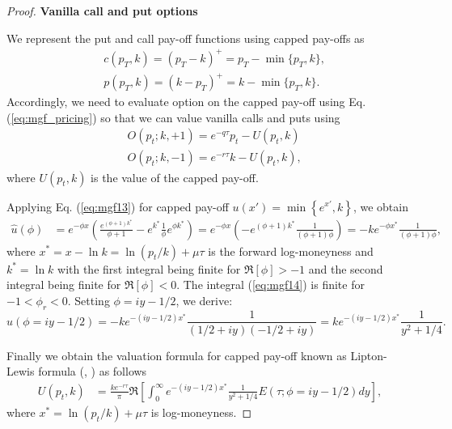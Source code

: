 \documentclass[pdftex,11pt,a4paper] {article}
\begin{document}
\begin{proof}


\textbf{Vanilla call and put options}

We represent the put and call pay-off functions using capped pay-offs as
\begin{equation} \label {eq:v11}
\begin{split}
  & c(p_T,k) = (p_T-k)^+=p_T-\min\{p_T,k\},\\
  & p(p_T,k) = (k-p_T)^+=k-\min\{p_T,k\}.
\end{split}
\end{equation}
Accordingly, we need to evaluate option on the capped pay-off using Eq. (\ref{eq:mgf_pricing}) so that we can value vanilla calls and puts using
\begin{equation} \label{eq:v9}
\begin{split}
  & O(p_{t}; k, +1)  = e^{-q\tau}p_{t}- U(p_{t}, k)\\
  & O(p_{t}; k, -1)  = e^{-r\tau} k - U(p_{t}, k),
\end{split}
\end{equation}
where $U(p_t,k)$ is the value of the capped pay-off.

Applying Eq. (\ref{eq:mgf13}) for capped pay-off $u(x')=\min \left\{ e^{x'}, k \right\}$, we obtain
\begin{equation} \label {eq:mgf14}
\begin{split}
   \widehat{u}(\phi) & =e^{-\phi x} \left( \frac{e^{(\phi+1) k^{*}}}{\phi+1} - e^{k^{*}}\frac{1}{\phi}e^{\phi k^{*}}\right) = e^{-\phi x}\left(-e^{(\phi+1) k^{*}} \frac{1}{(\phi+1)\phi} \right)= -k e^{-\phi x^{*}} \frac{1}{(\phi+1)\phi},
\end{split}
\end{equation}
where $x^{*}=x-\ln k=\ln(p_{t}/k)+\mu\tau$ is the forward log-moneyness and $k^{*}=\ln k$ with the first integral being finite for $\Re[\phi]>-1$ and the second integral being finite for $\Re[\phi]<0$. The integral (\ref{eq:mgf14}) is finite for $-1<\phi_{r}<0$. Setting $\phi=iy-1/2$, we derive:
\begin{equation}\label{eq:mgf15}
\widehat{u}(\phi = iy-1/2) = -k e^{-(iy-1/2) x^{*}}  \frac{1}{(1/2+iy)(-1/2+iy)}=
k e^{-(iy-1/2) x^{*}}  \frac{1}{y^{2}+1/4}.
\end{equation}

Finally we obtain the valuation formula for capped pay-off known as Lipton-Lewis formula (\cite{Lipton2001}, \cite{Lewis2000}) as follows
\begin{equation} \label {eq:v8}
\begin{split}
  U(p_{t}, k)&  = \frac{k e^{-r\tau} }{\pi} \Re\left[\int^{\infty}_{0} e^{-(iy-1/2) x^{*}}  \frac{1}{y^{2}+1/4} E(\tau; \phi=iy-1/2)dy\right],
\end{split}
\end{equation}
where $x^{*}=\ln(p_{t}/k)+\mu\tau$ is log-moneyness.




\end{proof}
\end{document}
